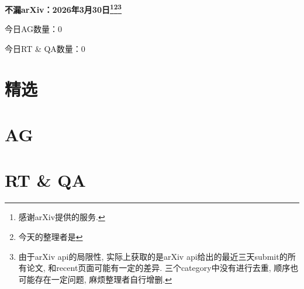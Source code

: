 \documentclass[9pt, a4paper]{article}
\theoremstyle{plain}
\theoremstyle{definition}
\theoremstyle{remark}
\newcommand{\AGnumber}{0}
\newcommand{\RTQAnumber}{0}
\newcommand{\NewestDate}{2026年3月30日}
\newcommand{\todayarXiver}{} %
\begin{document}
\begin{center}
    \Huge\textbf{不漏arXiv：\NewestDate\footnote{感谢arXiv提供的服务.}\footnote{今天的整理者是\todayarXiver}\footnote{由于arXiv api的局限性, 实际上获取的是arXiv api给出的最近三天submit的所有论文, 和recent页面可能有一定的差异. 三个category中没有进行去重, 顺序也可能存在一定问题, 麻烦整理者自行增删.}} \\
\end{center}

\setcounter{section}{-1}

\begin{center}
    今日AG数量：\AGnumber
    
    今日RT \& QA数量：\RTQAnumber
    
\end{center}


\section{精选}


\section{AG}

\section{RT \& QA}
\end{document}

